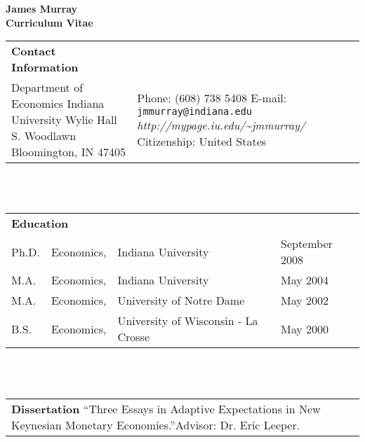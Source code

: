 \documentclass[12pt,notitlepage,oneside]{book}
\begin{document}
\newpage
\begin{singlespace}
\pagestyle{empty}
\begin{center} 
\textbf{\Large{James Murray}}\\
\textbf{Curriculum Vitae}\\
\end{center}
\small 

\begin{tabular}{p{3in} p{3in}}
\textbf{Contact Information} & \\
Department of Economics \newline
Indiana University\newline
105 Wylie Hall\newline
100 S. Woodlawn\newline 
Bloomington, IN 47405 &
Phone: (608) 738 5408\newline
E-mail: \texttt{jmmurray@indiana.edu}\newline
\textit{http://mypage.iu.edu/\~{}jmmurray/} \newline \newline
Citizenship: United States
\end{tabular} \\ \\

\begin{tabular}{p{.5in} p{.6in} p{2.5in} p{2in}}
\multicolumn{2}{l}{\textbf{Education} \newline} & \\

Ph.D. & Economics, & Indiana University & September 2008 \\
M.A. & Economics, & Indiana University & May 2004  \\
M.A. & Economics, & University of Notre Dame & May 2002 \\
B.S. & Economics, & University of Wisconsin - La Crosse & May 2000 \\
\end{tabular} \\ \\

\begin{tabular}{p{5.5in}}
\textbf{Dissertation} \newline
``Three Essays in Adaptive Expectations in New Keynesian Monetary Economies.''\newline  Advisor: Dr. Eric Leeper.
\end{tabular} \\ \\


\end{singlespace}
\end{document}
